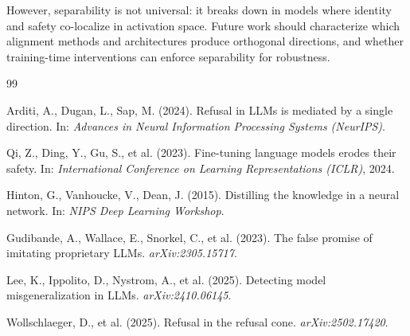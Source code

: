 \documentclass[letterpaper,twocolumn]{article}
\begin{document}
However, separability is not universal: it breaks down in models where identity and safety co-localize in activation space. Future work should characterize which alignment methods and architectures produce orthogonal directions, and whether training-time interventions can enforce separability for robustness.

\begin{thebibliography}{99}

 Arditi, A., Dugan, L., Sap, M. (2024). Refusal in LLMs is mediated by a single direction. In: \textit{Advances in Neural Information Processing Systems (NeurIPS)}.

 Qi, Z., Ding, Y., Gu, S., et al. (2023). Fine-tuning language models erodes their safety. In: \textit{International Conference on Learning Representations (ICLR)}, 2024.

 Hinton, G., Vanhoucke, V., Dean, J. (2015). Distilling the knowledge in a neural network. In: \textit{NIPS Deep Learning Workshop}.

 Gudibande, A., Wallace, E., Snorkel, C., et al. (2023). The false promise of imitating proprietary LLMs. \textit{arXiv:2305.15717}.

 Lee, K., Ippolito, D., Nystrom, A., et al. (2025). Detecting model misgeneralization in LLMs. \textit{arXiv:2410.06145}.

 Wollschlaeger, D., et al. (2025). Refusal in the refusal cone. \textit{arXiv:2502.17420}.

\end{thebibliography}
\end{document}
